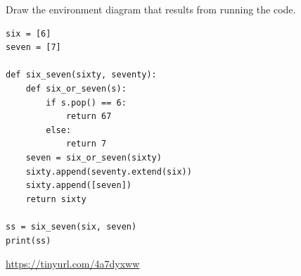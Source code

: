 \begin{blocksection}
\question Draw the environment diagram that results from running the code.

\begin{lstlisting}
six = [6]
seven = [7]

def six_seven(sixty, seventy):
    def six_or_seven(s):
        if s.pop() == 6:
            return 67
        else:
            return 7
    seven = six_or_seven(sixty)
    sixty.append(seventy.extend(six))
    sixty.append([seven])
    return sixty
    
ss = six_seven(six, seven)
print(ss)
\end{lstlisting}

\begin{solution}[2in]
\url{https://tinyurl.com/4a7dyxww}
\end{solution}
\end{blocksection}
